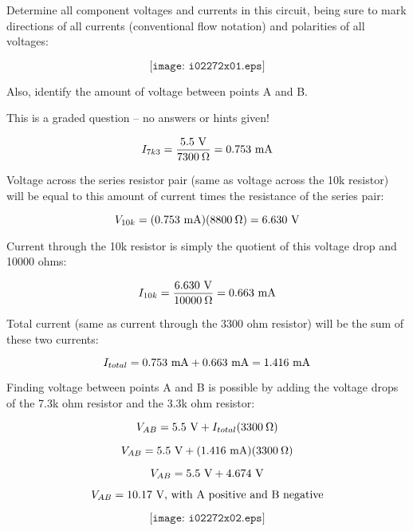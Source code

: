

Determine all component voltages and currents in this circuit, being sure to mark directions of all currents (conventional flow notation) and polarities of all voltages:

$$\texttt{[image: i02272x01.eps]}$$

Also, identify the amount of voltage between points A and B.

\vfil 

\eject






This is a graded question -- no answers or hints given!







$$I_{7k3} = {5.5 \hbox{ V} \over 7300 \> \Omega} =  0.753 \hbox{ mA}$$

Voltage across the series resistor pair (same as voltage across the 10k resistor) will be equal to this amount of current times the resistance of the series pair:

$$V_{10k} = (0.753 \hbox{ mA}) (8800 \> \Omega) = 6.630 \hbox{ V}$$

Current through the 10k resistor is simply the quotient of this voltage drop and 10000 ohms:

$$I_{10k} = {6.630 \hbox{ V} \over 10000 \> \Omega} = 0.663 \hbox{ mA}$$

Total current (same as current through the 3300 ohm resistor) will be the sum of these two currents:

$$I_{total} = 0.753 \hbox{ mA} + 0.663 \hbox{ mA} = 1.416 \hbox{ mA}$$

Finding voltage between points A and B is possible by adding the voltage drops of the 7.3k ohm resistor and the 3.3k ohm resistor:

$$V_{AB} = 5.5 \hbox{ V} + I_{total} (3300 \> \Omega)$$

$$V_{AB} = 5.5 \hbox{ V} + (1.416 \hbox{ mA}) (3300 \> \Omega)$$

$$V_{AB} = 5.5 \hbox{ V} + 4.674 \hbox{ V}$$

$$V_{AB} = 10.17 \hbox{ V, with A positive and B negative}$$

$$\texttt{[image: i02272x02.eps]}$$




